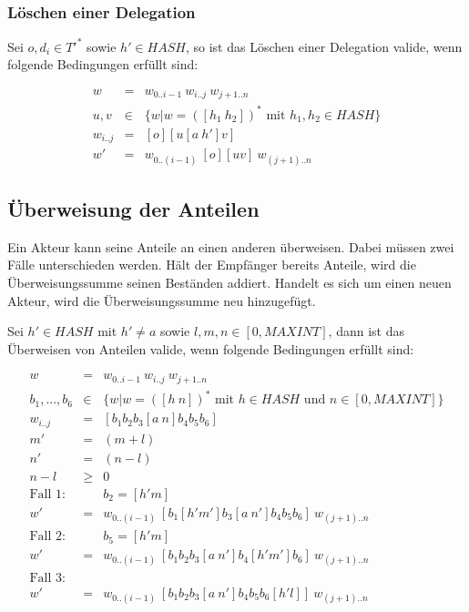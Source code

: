 \documentclass[a4paper,12pt]{report}
\begin{document}
\subsubsection*{Löschen einer Delegation}

Sei $o,d_i \in T'^*$ sowie $h'\in HASH$, so ist das Löschen einer Delegation valide, wenn folgende Bedingungen erfüllt sind:

\begin{eqnarray}
  w &=& w_{0 .. i-1}\ w_{i..j}\ w_{j+1 .. n} \\
  u,v &\in& \{ w | w = ([h_1\ h_2])^*\text{ mit } h_1,h_2 \in HASH \} \\
  w_{i..j} &=& [o][u[a\ h']v] \\
  w' &=& w_{0 .. (i-1)}\ [o][uv]\ w_{(j+1) .. n}
\end{eqnarray}

\subsection{Überweisung der Anteilen}
\label{manipulationanteile}

Ein Akteur kann seine Anteile an einen anderen überweisen. Dabei müssen zwei Fälle unterschieden werden. Hält der Empfänger bereits Anteile, wird die Überweisungssumme seinen Beständen addiert. Handelt es sich um einen neuen Akteur, wird die Überweisungssumme neu hinzugefügt. 

Sei $h'\in HASH$ mit $h' \neq a$ sowie $l,m,n\in [0,MAXINT]$, dann ist das Überweisen von Anteilen valide, wenn folgende Bedingungen erfüllt sind:



\begin{eqnarray}
  w &=& w_{0 .. i-1}\ w_{i..j}\ w_{j+1 .. n} \\
  b_1, ..., b_6 &\in& \{ w | w = ([h\ n])^*\text{ mit } h \in HASH\text{ und }n\in[0,MAXINT] \} \\
  w_{i..j} &=& [ b_1 b_2 b_3 [a\ n] b_4 b_5 b_6 ] \\
  m' &=& (m+l) \\
  n' &=& (n-l) \\
  n - l &\geq& 0\\
  \text{Fall 1: } &&b_2 = [h' m]\\
  w' &=& w_{0 .. (i-1)}\ [ b_1 [h' m'] b_3 [a\ n'] b_4 b_5 b_6 ]\ w_{(j+1) .. n} \\
  \text{Fall 2: } &&b_5 = [h' m]\\
  w' &=& w_{0 .. (i-1)}\ [ b_1 b_2 b_3 [a\ n'] b_4 [h' m'] b_6 ]\ w_{(j+1) .. n}\\
  \text{Fall 3: } && \\
  w' &=& w_{0 .. (i-1)}\ [ b_1 b_2 b_3 [a\ n'] b_4 b_5 b_6 [h' l]]\ w_{(j+1) .. n}
\end{eqnarray}
\end{document}
